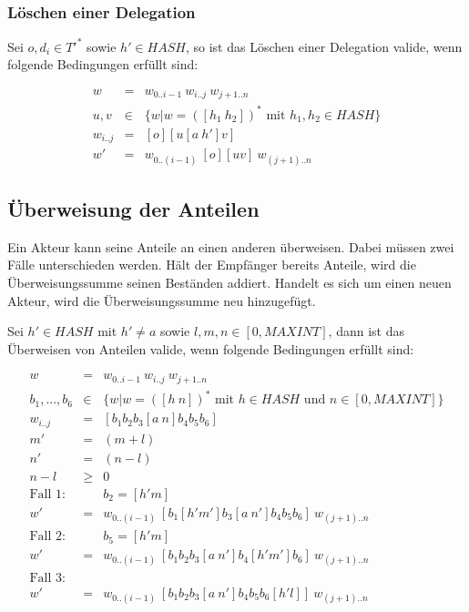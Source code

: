 \documentclass[a4paper,12pt]{report}
\begin{document}
\subsubsection*{Löschen einer Delegation}

Sei $o,d_i \in T'^*$ sowie $h'\in HASH$, so ist das Löschen einer Delegation valide, wenn folgende Bedingungen erfüllt sind:

\begin{eqnarray}
  w &=& w_{0 .. i-1}\ w_{i..j}\ w_{j+1 .. n} \\
  u,v &\in& \{ w | w = ([h_1\ h_2])^*\text{ mit } h_1,h_2 \in HASH \} \\
  w_{i..j} &=& [o][u[a\ h']v] \\
  w' &=& w_{0 .. (i-1)}\ [o][uv]\ w_{(j+1) .. n}
\end{eqnarray}

\subsection{Überweisung der Anteilen}
\label{manipulationanteile}

Ein Akteur kann seine Anteile an einen anderen überweisen. Dabei müssen zwei Fälle unterschieden werden. Hält der Empfänger bereits Anteile, wird die Überweisungssumme seinen Beständen addiert. Handelt es sich um einen neuen Akteur, wird die Überweisungssumme neu hinzugefügt. 

Sei $h'\in HASH$ mit $h' \neq a$ sowie $l,m,n\in [0,MAXINT]$, dann ist das Überweisen von Anteilen valide, wenn folgende Bedingungen erfüllt sind:



\begin{eqnarray}
  w &=& w_{0 .. i-1}\ w_{i..j}\ w_{j+1 .. n} \\
  b_1, ..., b_6 &\in& \{ w | w = ([h\ n])^*\text{ mit } h \in HASH\text{ und }n\in[0,MAXINT] \} \\
  w_{i..j} &=& [ b_1 b_2 b_3 [a\ n] b_4 b_5 b_6 ] \\
  m' &=& (m+l) \\
  n' &=& (n-l) \\
  n - l &\geq& 0\\
  \text{Fall 1: } &&b_2 = [h' m]\\
  w' &=& w_{0 .. (i-1)}\ [ b_1 [h' m'] b_3 [a\ n'] b_4 b_5 b_6 ]\ w_{(j+1) .. n} \\
  \text{Fall 2: } &&b_5 = [h' m]\\
  w' &=& w_{0 .. (i-1)}\ [ b_1 b_2 b_3 [a\ n'] b_4 [h' m'] b_6 ]\ w_{(j+1) .. n}\\
  \text{Fall 3: } && \\
  w' &=& w_{0 .. (i-1)}\ [ b_1 b_2 b_3 [a\ n'] b_4 b_5 b_6 [h' l]]\ w_{(j+1) .. n}
\end{eqnarray}
\end{document}
